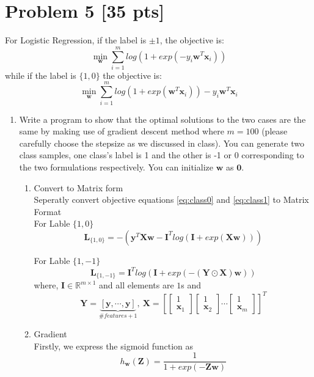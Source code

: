 \documentclass[11pt]{article}
\newcommand{\mtx}[1]{\mathbf{#1}}
\newcommand{\vct}[1]{\mathbf{#1}}
\def \mI {\mtx{I}}
\def \mL {\mtx{L}}
\def \mX {\mtx{X}}
\def \mY {\mtx{Y}}
\def \mZ {\mtx{Z}}
\def \vzero    {\vct{0}}
\def \vw {\vct{w}}
\def \vx {\vct{x}}
\def \vy {\vct{y}}
\begin{document}
\section{Problem 5 [35 pts]}
For Logistic Regression, if the label is $\pm1$, the objective is:
\begin{equation}\label{eq:class1}
\min_\vw	\sum_{i=1}^{m}log(1+exp(-y_i\vw^T\vx_i))
\end{equation}
while if the label is $\{1,0\}$ the objective is:
\begin{equation}\label{eq:class0}
	\min_\vw	\sum_{i=1}^{m}log(1+exp(\vw^T\vx_i))-y_i\vw^T\vx_i
\end{equation}
\begin{enumerate}
	\item Write a program to show that the optimal solutions to the two cases  are the same by making use of gradient descent method where $m=100$ (please carefully choose the stepsize as we discussed in class). You can generate two class samples, one class's label is 1 and the other is -1 or 0 corresponding to the two formulations respectively. You can initialize $\vw$ as $\vzero$.
	\begin{enumerate}
		
		\item Convert to Matrix form \\
		Seperatly convert objective equations \ref{eq:class0} and  \ref{eq:class1} to Matrix Format
		\\
		For Lable $\{1,0\}$
		\begin{equation}
			\mL_{\{1,0\}} =  -(\vy^T\mX\vw - \mI^Tlog(\mI+exp(\mX\vw)))
		\end{equation}

		For Lable $\{1,-1\}$
		\begin{equation}
			\mL_{\{1,-1\}} = \mI^Tlog(\mI+exp(-(\mY\odot\mX)\vw ))
		\end{equation}
		where, 
		$\mI \in \mathbb{R}^{m\times 1}$ and all elements are $1$s
		and 
		$$ \mY = \underbrace{\left[\vy,\cdots, \vy\right]}_{\# features + 1},\ 
		\mX =\left[ 
			\begin{bmatrix}
			1 \\
			\vx_1
			\end{bmatrix}	
			\begin{bmatrix}
				1 \\
				\vx_2
			\end{bmatrix}
			\cdots
			\begin{bmatrix}
				1 \\
				\vx_m
			\end{bmatrix}
			\right]^T 
		$$
		\item Gradient\\
		Firstly, we express the sigmoid function as 
		\begin{equation}
			h_{\vw}(\mZ) = \frac{1}{1+exp(-\mZ\vw)}
		\end{equation}


\end{enumerate}
\end{enumerate}
\end{document}
